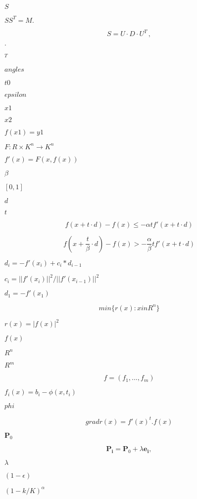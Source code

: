 \documentclass{article}
\begin{document}
$ S $
\pagebreak

$ S S^T = M. $
\pagebreak

\[ S = U \cdot D \cdot U^T \, ,\]
\pagebreak

$ \cdot $
\pagebreak

$ ^T  $
\pagebreak

$ angles $
\pagebreak

$ t0 $
\pagebreak

$ epsilon $
\pagebreak

$ x1 $
\pagebreak

$ x2 $
\pagebreak

$ f(x1)=y1 $
\pagebreak

$ F: R \times K^n
\rightarrow K^n $
\pagebreak

$ f'(x) = F(x,f(x)) $
\pagebreak

$ \beta $
\pagebreak

$ [0,1]
$
\pagebreak

$ d
$
\pagebreak

$ t
$
\pagebreak

\[ f(x + t \cdot d) - f(x) \leq -\alpha t f'(x+t \cdot d) \]
\pagebreak

\[ f(x+\frac{t}{\beta} \cdot d) - f(x) > -\frac{\alpha}{\beta}
    t f'(x+t \cdot d) \]
\pagebreak

$ d_i = - f'(x_i) + c_i*d_{i-1} $
\pagebreak

$ c_i = ||f'(x_i)||^2/||f'(x_{i-1})||^2 $
\pagebreak

$ d_1 = - f'(x_1) $
\pagebreak

\[ min \{ r(x) : x in R^n \} \]
\pagebreak

$ r(x) = |f(x)|^2 $
\pagebreak

$f(x) $
\pagebreak

$ R^n $
\pagebreak

$ R^m $
\pagebreak

\[ f = (f_1, ..., f_m) \]
\pagebreak

$ f_i(x) = b_i - \phi(x,t_i) $
\pagebreak

$ phi $
\pagebreak

\[ grad r(x) = f'(x)^t.f(x) \]
\pagebreak

$\mathbf{P}_{0} $
\pagebreak

\[    \mathbf{P}_{\mathbf{i}}=\mathbf{P}_{0}+\lambda \mathbf{e}_{\mathbf{i}},
\]
\pagebreak

$ \lambda $
\pagebreak

$ (1-\epsilon) $
\pagebreak

$ ( 1 - k/K )^\alpha $
\pagebreak
\end{document}
